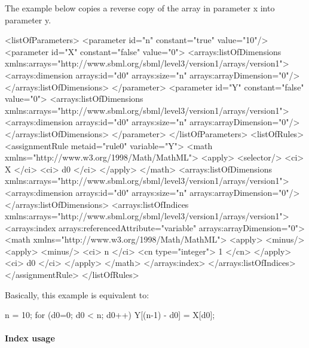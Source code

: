 The example below copies a reverse copy of the array in parameter x into parameter y.    

\begin{example}[showstringspaces=false]
<listOfParameters>
  <parameter id="n" constant="true" value="10"/>
  <parameter id="X" constant="false" value="0">
    <arrays:listOfDimensions xmlns:arrays="http://www.sbml.org/sbml/level3/version1/arrays/version1">
      <arrays:dimension arrays:id="d0" arrays:size="n" arrays:arrayDimension="0"/>
    </arrays:listOfDimensions>
  </parameter>
  <parameter id="Y" constant="false" value="0">
    <arrays:listOfDimensions xmlns:arrays="http://www.sbml.org/sbml/level3/version1/arrays/version1">
      <arrays:dimension arrays:id="d0" arrays:size="n" arrays:arrayDimension="0"/>
    </arrays:listOfDimensions>
  </parameter>
</listOfParameters>
<listOfRules>
  <assignmentRule metaid="rule0" variable="Y">
    <math xmlns="http://www.w3.org/1998/Math/MathML">
      <apply>
        <selector/>
        <ci> X </ci>
        <ci> d0 </ci>
      </apply>
    </math>
    <arrays:listOfDimensions xmlns:arrays="http://www.sbml.org/sbml/level3/version1/arrays/version1">
      <arrays:dimension arrays:id="d0" arrays:size="n" arrays:arrayDimension="0"/>
    </arrays:listOfDimensions>
    <arrays:listOfIndices xmlns:arrays="http://www.sbml.org/sbml/level3/version1/arrays/version1">
      <arrays:index arrays:referencedAttribute="variable" arrays:arrayDimension="0">
        <math xmlns="http://www.w3.org/1998/Math/MathML">
          <apply>
            <minus/>
            <apply>
              <minus/>
              <ci> n </ci>
              <cn type="integer"> 1 </cn>
            </apply>
            <ci> d0 </ci>
          </apply>
        </math>
      </arrays:index>
    </arrays:listOfIndices>
  </assignmentRule>
</listOfRules>
\end{example}

Basically, this example is equivalent to:

\begin{example}
n = 10;
for (d0=0; d0 < n; d0++) {
  Y[(n-1) - d0] = X[d0];
}
\end{example}

\paragraph{Index usage}

